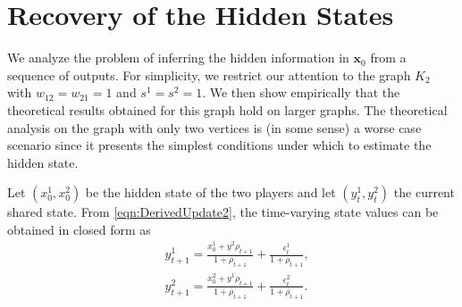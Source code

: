 \documentclass[aps,superscriptaddress,floatfix,amsmath,amssymb]{revtex4-2}
\begin{document}
\section{Recovery of the Hidden States}\label{sec:Hidden}
We analyze the problem of inferring the hidden information in $\mathbf{x}_0$ from a sequence of outputs. For simplicity, we restrict our attention to the graph $K_2$ with $w_{12} = w_{21} = 1$ and $s^1 = s^2 = 1$. We then show empirically that the theoretical results obtained for this graph hold on larger graphs. The theoretical analysis on the graph with only two vertices is (in some sense) a worse case scenario since it presents the simplest conditions under which to estimate the hidden state.

Let $(x^1_0,x^2_0)$ be the hidden state of the two players and let $(y^1_t, y^2_t)$ the current shared state. From \cref{eqn:DerivedUpdate2}, the time-varying state values can be obtained in closed form as
\begin{align}
&y^1_{t+1} = \frac{x^1_0 + y^2\rho_{t+1}}{1+\rho_{t+1}} + \frac{\epsilon_t^1}{1+\rho_{t+1}},\\
&y^2_{t+1} = \frac{x^2_0 + y^1\rho_{t+1}}{1+\rho_{t+1}} + \frac{\epsilon_t^2}{1+\rho_{t+1}}.
\end{align}

\end{document}
